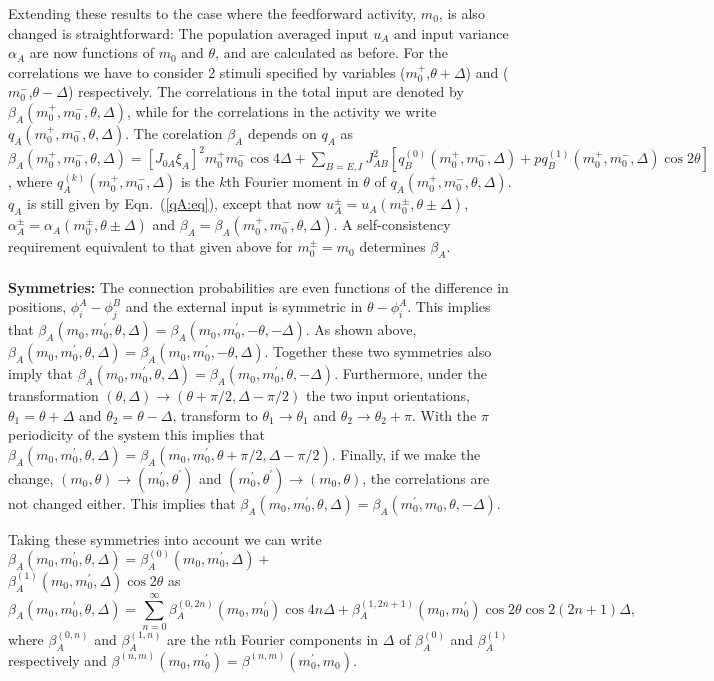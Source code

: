 Extending these results to the case where the feedforward activity, $m_0$, is also 
changed is straightforward:
The population averaged input $u_A$ and input variance $\alpha_A$ are now
functions of $m_0$ and $\theta$, and are calculated as before. 
For the correlations we have to consider 2 stimuli specified by variables
($m_0^+$,$\theta+\Delta$) and ($m_0^-$,$\theta-\Delta$) respectively.  
The correlations in the total input are denoted by 
$\beta_A(m_0^+,m_0^-,\theta,\Delta)$, while for the correlations in the 
activity we write $q_A(m_0^+,m_0^-,\theta,\Delta)$\@.
The corelation $\beta_A$ depends on $q_A$ as
$\beta_A(m_0^+,m_0^-,\theta,\Delta)=[J_{0A}\xi_A]^2m_0^+m_0^-\cos 4\Delta+
\sum_{B=E,I}J_{AB}^2[q_B^{(0)}(m_0^+,m_0^-,\Delta)+
pq_B^{(1)}(m_0^+,m_0^-,\Delta)\cos 2\theta]$, where 
$q_A^{(k)}(m_0^+,m_0^-,\Delta)$ is the $k$th Fourier moment in $\theta$
of $q_A(m_0^+,m_0^-,\theta,\Delta)$\@. $q_A$ is still given by
Eqn.~(\ref{qA:eq}), except that now $u_A^\pm=u_A(m_0^\pm,\theta\pm\Delta)$,
$\alpha_A^\pm=\alpha_A(m_0^\pm,\theta\pm\Delta)$ and 
$\beta_A=\beta_A(m_0^+,m_0^-,\theta,\Delta)$\@.
A self-consistency requirement equivalent to that given above for 
$m_0^\pm=m_0$  determines $\beta_A$.\\
 \\
{\noindent \bf Symmetries:}
The connection probabilities are even functions of the difference in 
positions, $\phi_i^A-\phi_j^B$ and the external input is 
symmetric in $\theta-\phi_i^A$\@. This implies that 
$\beta_{A}(m_0,m_0^\prime,\theta,\Delta)=
\beta_{A}(m_0,m_0^\prime,-\theta,-\Delta)$.
As shown above, $\beta_{A}(m_0,m_0^\prime,\theta,\Delta)=
\beta_{A}(m_0,m_0^\prime,-\theta,\Delta)$\@. Together these two symmetries also imply that
$\beta_{A}(m_0,m_0^\prime,\theta,\Delta)=
\beta_{A}(m_0,m_0^\prime,\theta,-\Delta)$\@. Furthermore, under the 
transformation $(\theta,\Delta)\rightarrow (\theta+\pi/2,\Delta-\pi/2)$ the two
input orientations, $\theta_1=\theta+\Delta$ and $\theta_2=\theta-\Delta$, 
transform to $\theta_1 \rightarrow \theta_1$ and 
$\theta_2\rightarrow\theta_2+\pi$\@. With the $\pi$ periodicity of the system 
this implies that $\beta_{A}(m_0,m_0^\prime,\theta,\Delta)=
\beta_{A}(m_0,m_0^\prime,\theta+\pi/2,\Delta-\pi/2)$\@. Finally, if we make the
change, $(m_0,\theta)\rightarrow(m_0^\prime,\theta^\prime)$ and 
$(m_0^\prime,\theta^\prime)\rightarrow(m_0,\theta)$, the correlations are not 
changed either. This implies that 
$\beta_{A}(m_0,m_0^\prime,\theta,\Delta)=\beta_{A}(m_0^\prime,m_0,\theta,-\Delta)$\@.

Taking these symmetries into account we can write 
$\beta_{A}(m_0,m_0^\prime,\theta,\Delta)=\beta_{A}^{(0)}
(m_0,m_0^\prime,\Delta)+$\\$\beta_{A}^{(1)}(m_0,m_0^\prime,\Delta)\cos 2\theta$ as
\begin{equation}
\beta_{A}(m_0,m_0^\prime,\theta,\Delta)=
\sum_{n=0}^\infty \beta_{A}^{(0,2n)}(m_0,m_0^\prime)\cos 4n \Delta
+\beta_{A}^{(1,2n+1)}(m_0,m_0^\prime)\cos 2\theta\cos 2(2n+1) \Delta,
\end{equation}
where $\beta_{A}^{(0,n)}$ and $\beta_{A}^{(1,n)}$ are the $n$th Fourier
components in $\Delta$ of $\beta_{A}^{(0)}$ and $\beta_{A}^{(1)}$
respectively and $\beta^{(n,m)}(m_0,m_0^\prime)=
\beta^{(n,m)}(m_0^\prime,m_0)$\@.


